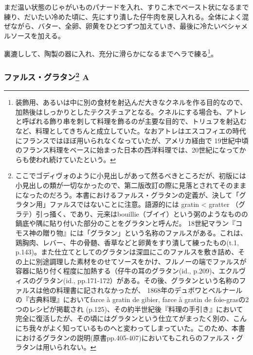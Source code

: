 \begin{recette}
まだ温い状態のじゃがいものパナードを入れ、すりこ木でペースト状になるまで練り、だいたい冷めた頃に、先にすり潰した仔牛肉を戻し入れる。全体によく混ぜながら、バター、全卵、卵黄をひとつずつ加えていき、最後に冷たいベシャメルソースを加える。

裏漉しして、陶製の器に入れ、充分に滑らかになるまでヘラで練る\footnote{装飾用、あるいは中に別の食材を射込んだ大きなクネルを作る目的なので、加熱後はしっかりとしたテクスチュアとなる。クネルにする場合も、アトレと呼ばれる飾り串を刺して料理を飾るのが主要な目的で、トリュフを射込むなど、料理としてきちんと成立していた。なおアトレはエスコフィエの時代にフランスではほぼ用いられなくなっていたが、アメリカ経由で
  19世紀中頃のフランス料理をベースに始まった日本の西洋料理では、20世紀になってからも使われ続けていたという。}。


\hypertarget{farce-gratin-a}{%
\subsubsection[ファルス・グラタン
A]{\texorpdfstring{ファルス・グラタン\footnote{ここでゴディヴォのように小見出しがあって然るべきところだが、初版には小見出しの類が一切なかったので、第二版改訂の際に見落とされてそのままになったのだろう。本書におけるファルス・グラタンの定義が、決して「グラタン用」ファルスではないことに注意。語源的には
  gratin \textless{} gratter
  （グラテ）引っ掻く、であり、元来はbouillie（ブイイ）という粥のようなものの鍋底や隅に貼り付いた部分のことをグラタンと呼んだ。
  18世紀マラン『コモス神の贈り物』には「グラタン」という名称のファルスがある。これは、鶏胸肉、レバー、牛の骨髄、香草などと卵黄をすり潰して練ったもの(t.1,
  p.143)。また仕立てとしてのグラタンは深皿にこのファルスを敷き詰め、その上に別途調理した素材をのせてソースをかけ、フルノーの端でファルスが容器に貼り付く程度に加熱する（仔牛の耳のグラタン(id.,
  p.209)、エクルヴィスのグラタン(id.,
  pp.171-172）がある。その後、グラタンという名称のファルスは他の料理書に記されなかったが、
  1868年のデュボワとベルナールの『古典料理』においてfarce à gratin de
  gibier, farce à gratin de foie-grasの2つのレシピが掲載され
  (p.125)、その約半世紀後『料理の手引き』において完全に復活したが、その頃にはグラタンという仕立てがまったく別の、こんにち我々がよく知っているものへと変わってしまっていた。このため、本書におけるグラタンの説明(原書pp.405-407)においてもこれらのファルス・グラタンは用いられない。}
A}{ファルス・グラタン A}}\label{farce-gratin-a}}


\end{recette}

